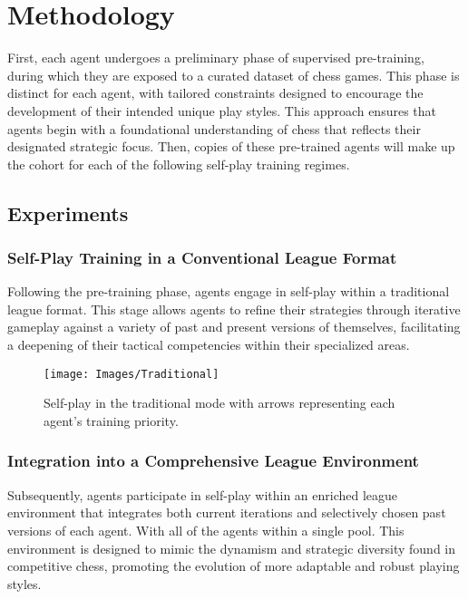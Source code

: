 \documentclass[journal]{IEEEtran}
\begin{document}
	
	\section{Methodology}
	\label{sec:methodology}
	
	First, each agent undergoes a preliminary phase of supervised pre-training, 
	during which they are exposed to a curated dataset of chess games. 
	This phase is distinct for each agent, with tailored constraints designed to encourage the development of their intended unique play styles. 
	This approach ensures that agents begin with a foundational understanding of chess that reflects their designated strategic focus.	
	Then, copies of these pre-trained agents will make up the cohort for each of the following self-play training regimes.
	
	\subsection{Experiments}
	
	\subsubsection{Self-Play Training in a Conventional League Format}
	Following the pre-training phase, agents engage in self-play within a traditional league format. 
	This stage allows agents to refine their strategies through iterative gameplay against a variety of past and present versions of themselves,
	facilitating a deepening of their tactical competencies within their specialized areas.
	
	\begin{figure}
		\centering
		\texttt{[image: Images/Traditional]}
		\caption{Self-play in the traditional mode with arrows representing each agent's training priority.}
		\label{fig:traditional}
	\end{figure}

	
	\subsubsection{Integration into a Comprehensive League Environment} 
	Subsequently, agents participate in self-play within an enriched league environment that 
	integrates both current iterations and selectively chosen past versions of each agent.
	With all of the agents within a single pool.
	This environment is designed to mimic the dynamism and strategic diversity found in competitive chess, 
	promoting the evolution of more adaptable and robust playing styles.
\end{document}
